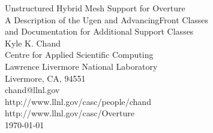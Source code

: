 \documentclass{article}
\begin{document}
\def\uvd    {{\bf U}}
\def\ud     {{    U}}
\def\pd     {{    P}}
\def\id     {i}
\def\jd     {j}
\def\kap {\sqrt{s+\omega^2}}

\newcommand{\primer}{\homeHenshaw/res/primer}
\newcommand{\gf}{\homeHenshaw/res/gf}
\newcommand{\mapping}{\homeHenshaw/res/mapping}
\newcommand{\ogshow}{\homeHenshaw/res/ogshow}
\newcommand{\oges}{\homeHenshaw/res/oges}
\newcommand{\figures}{\homeHenshaw/OvertureFigures}

\begin{flushleft}
 ~~  \\
 ~~  \\
 ~~  \\
 ~~  \\
 ~~  \\
  {\Large 
   Unstructured Hybrid Mesh Support for Overture  \\ 
   A Description of the Ugen and AdvancingFront Classes  \\
   and Documentation for Additional Support Classes 
  }\\
\vspace{2\baselineskip}
Kyle K. Chand \\
Centre for Applied Scientific Computing \\
Lawrence Livermore National Laboratory    \\
Livermore, CA, 94551   \\
chand@llnl.gov \\
http://www.llnl.gov/casc/people/chand \\
http://www.llnl.gov/casc/Overture \\
\vspace{1\baselineskip}
\today
\vspace{\baselineskip}

\end{flushleft}

\vspace{1\baselineskip}
\end{document}
